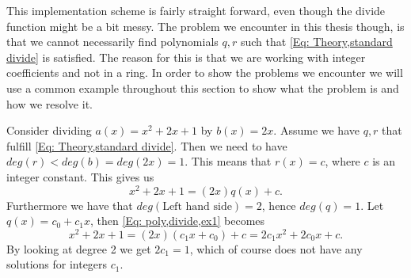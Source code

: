 This implementation scheme is fairly straight forward, even though the divide function might be a bit messy. The problem we encounter in this thesis though, is that we cannot necessarily find polynomials $q,r$ such that \ref{Eq: Theory,standard divide} is satisfied. The reason for this is that we are working with integer coefficients and not in a ring. In order to show the problems we encounter we will use a common example throughout this section to show what the problem is and how we resolve it.
\begin{example}
  Consider dividing $a(x)=x^2+2x+1$ by $b(x)=2x$. Assume we have $q,r$ that fulfill \ref{Eq: Theory,standard divide}. Then we need to have $deg(r)<deg(b)=deg(2x)=1$. This means that $r(x)=c$, where $c$ is an integer constant. This gives us
  \begin{equation}\label{Eq: poly,divide,ex1}
    x^2+2x+1=(2x)q(x)+c.
  \end{equation}
  Furthermore we have that $deg(\text{Left hand side})=2$, hence $deg(q)=1$. Let $q(x)=c_0+c_1x$, then \ref{Eq: poly,divide,ex1} becomes
  \begin{equation}
    x^2+2x+1=(2x)(c_1x+c_0)+c=2c_1x^2+2c_0x+c.
  \end{equation}
  By looking at degree 2 we get $2c_1=1$, which of course does not have any solutions for integers $c_1$.
\end{example}

